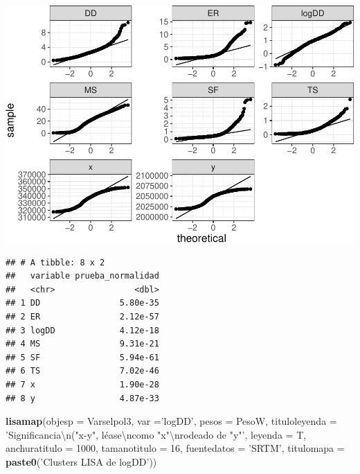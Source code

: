 \documentclass[11pt,]{article}
\newenvironment{Shaded}{\begin{snugshade}}{\end{snugshade}}
\newcommand{\KeywordTok}[1]{\textcolor[rgb]{0.13,0.29,0.53}{\textbf{#1}}}
\newcommand{\DataTypeTok}[1]{\textcolor[rgb]{0.13,0.29,0.53}{#1}}
\newcommand{\DecValTok}[1]{\textcolor[rgb]{0.00,0.00,0.81}{#1}}
\newcommand{\CharTok}[1]{\textcolor[rgb]{0.31,0.60,0.02}{#1}}
\newcommand{\StringTok}[1]{\textcolor[rgb]{0.31,0.60,0.02}{#1}}
\newcommand{\OperatorTok}[1]{\textcolor[rgb]{0.81,0.36,0.00}{\textbf{#1}}}
\newcommand{\NormalTok}[1]{#1}
\begin{document}
\includegraphics{proyecto_f_files/figure-latex/unnamed-chunk-72-3.pdf}

\begin{Shaded}
\end{Shaded}

\begin{verbatim}
## # A tibble: 8 x 2
##   variable prueba_normalidad
##   <chr>                <dbl>
## 1 DD                5.80e-35
## 2 ER                2.12e-57
## 3 logDD             4.12e-18
## 4 MS                9.31e-21
## 5 SF                5.94e-61
## 6 TS                7.02e-46
## 7 x                 1.90e-28
## 8 y                 4.87e-33
\end{verbatim}

\begin{Shaded}
\begin{Highlighting}[]
\KeywordTok{lisamap}\NormalTok{(}\DataTypeTok{objesp =}\NormalTok{ Varselpol3,}
        \DataTypeTok{var =}\StringTok{'logDD'}\NormalTok{,}
        \DataTypeTok{pesos =}\NormalTok{ PesoW,}
        \DataTypeTok{tituloleyenda =} \StringTok{'Significancia}\CharTok{\textbackslash{}n}\StringTok{("x-y", léase}\CharTok{\textbackslash{}n}\StringTok{como "x"}\CharTok{\textbackslash{}n}\StringTok{rodeado de "y"'}\NormalTok{,}
        \DataTypeTok{leyenda =}\NormalTok{ T,}
        \DataTypeTok{anchuratitulo =} \DecValTok{1000}\NormalTok{,}
        \DataTypeTok{tamanotitulo =} \DecValTok{16}\NormalTok{,}
        \DataTypeTok{fuentedatos =} \StringTok{'SRTM'}\NormalTok{,}
        \DataTypeTok{titulomapa =} \KeywordTok{paste0}\NormalTok{(}\StringTok{'Clusters LISA de logDD'}\NormalTok{))}
\end{Highlighting}
\end{Shaded}
\end{document}

